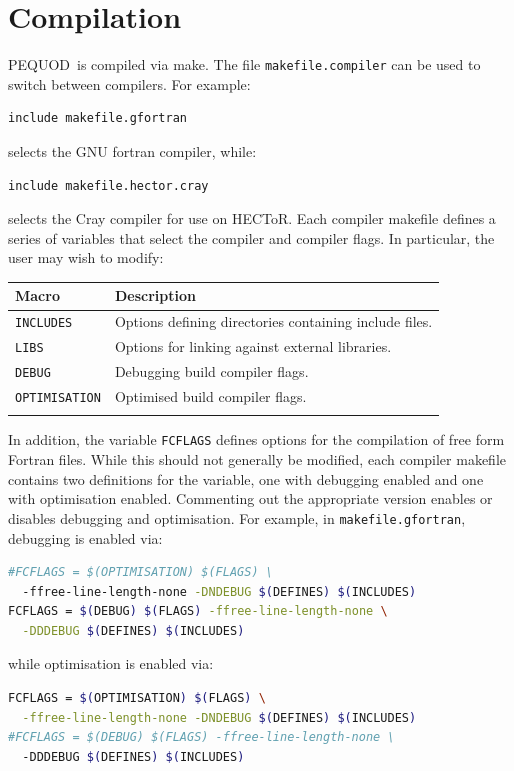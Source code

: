 \documentclass[a4paper]{book}
\newcommand{\pequod}{PEQUOD}
\begin{document}
\section{Compilation}\label{sect:make}

\pequod\ is compiled via make. The file \verb+makefile.compiler+ can be used to
switch between compilers. For example:
\begin{lstlisting}[language = bash, frame = single]
include makefile.gfortran
\end{lstlisting}
selects the GNU fortran compiler, while:
\begin{lstlisting}[language = bash, frame = single]
include makefile.hector.cray
\end{lstlisting}
selects the Cray compiler for use on HECToR. Each compiler makefile defines a
series of variables that select the compiler and compiler flags. In particular,
the user may wish to modify:

\begin{longtable}{ | p{} | p{} | }
  \hline
  Macro & Description \\
  \hline
  \endhead
  \verb+INCLUDES+     & Options defining directories containing include files. \\
  \verb+LIBS+         & Options for linking against external libraries. \\
  \verb+DEBUG+        & Debugging build compiler flags. \\
  \verb+OPTIMISATION+ & Optimised build compiler flags. \\
  \hline
  \endfoot
\end{longtable}

In addition, the variable \verb+FCFLAGS+ defines options for the compilation of
free form Fortran files. While this should not generally be modified, each
compiler makefile contains two definitions for the variable, one with debugging
enabled and one with optimisation enabled. Commenting out the appropriate
version enables or disables debugging and optimisation. For example, in
\verb+makefile.gfortran+, debugging is enabled via:
\begin{lstlisting}[language = bash, frame = single]
#FCFLAGS = $(OPTIMISATION) $(FLAGS) \
  -ffree-line-length-none -DNDEBUG $(DEFINES) $(INCLUDES)
FCFLAGS = $(DEBUG) $(FLAGS) -ffree-line-length-none \
  -DDDEBUG $(DEFINES) $(INCLUDES)
\end{lstlisting}
while optimisation is enabled via:
\begin{lstlisting}[language = bash, frame = single]
FCFLAGS = $(OPTIMISATION) $(FLAGS) \
  -ffree-line-length-none -DNDEBUG $(DEFINES) $(INCLUDES)
#FCFLAGS = $(DEBUG) $(FLAGS) -ffree-line-length-none \
  -DDDEBUG $(DEFINES) $(INCLUDES)
\end{lstlisting}
\end{document}
